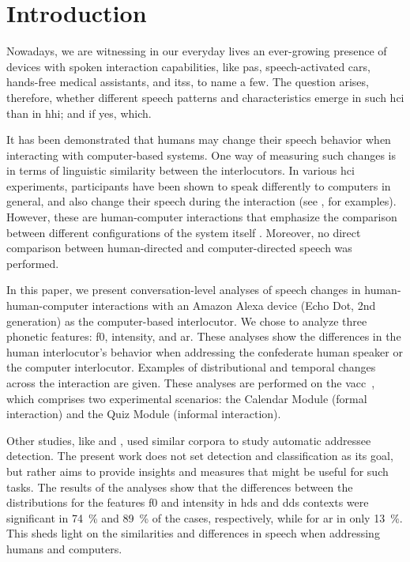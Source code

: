 \section{Introduction}
\label{sec:introduction}

Nowadays, we are witnessing in our everyday lives an ever-growing presence of devices with spoken interaction capabilities, like \acp{pa}, speech-activated cars, hands-free medical assistants, and \acp{its}, to name a few.
The question arises, therefore, whether different speech patterns and characteristics emerge in such \ac{hci} than in \ac{hhi}; and if yes, which.

It has been demonstrated that humans may change their speech behavior when interacting with computer-based systems.
One way of measuring such changes is in terms of linguistic similarity between the interlocutors.
In various \ac{hci} experiments, participants have been shown to speak differently to computers in general, and also change their speech during the interaction (see \citet{Branigan2010linguistic}, for examples).
However, these are human-computer interactions  that emphasize the comparison between different configurations of the system itself \citep[e.g.,][]{Levitan2016implementing}.
Moreover, no direct comparison between human-directed and computer-directed speech was performed.

In this paper, we present conversation-level analyses of speech changes in human-human-computer interactions with an Amazon Alexa device (Echo Dot, 2nd generation) as the computer-based interlocutor.
We chose to analyze three phonetic features: \ac{f0}, intensity, and \ac{ar}.
These analyses show the differences in the human interlocutor's behavior when addressing the confederate human speaker or the computer interlocutor.
Examples of distributional and temporal changes across the interaction are given.
These analyses are performed on the \acf{vacc}~\citep{Siegert2018VACC}, which comprises two experimental scenarios: the Calendar Module (formal interaction) and the Quiz Module (informal interaction).

Other studies, like \citet{Shriberg2013addressee} and \citet{vanTurnhout2005identifying}, used similar corpora to study automatic addressee detection.
The present work does not set detection and classification as its goal, but rather aims to provide insights and measures that might be useful for such tasks.
The results of the analyses show that the differences between the distributions for the features \ac{f0} and intensity in \ac{hds} and \ac{dds} contexts were significant in \SI{74}{\percent} and \SI{89}{\percent} of the cases, respectively, while for \ac{ar} in only \SI{13}{\percent}.
This sheds light on the similarities and differences in speech when addressing humans and computers.

